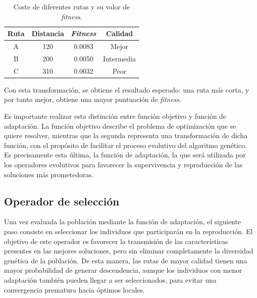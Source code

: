 \begin{table}[ht]
    \renewcommand{\arraystretch}{1.3}
    \caption{Coste de diferentes rutas y su valor de \textit{fitness}.}
    \label{tab:fit_ex}
    \begin{center}
        \begin{tabular}{|c|c|c|c|}
            \hline
            \textbf{Ruta} & \textbf{Distancia} & \textbf{\textit{Fitness}} & \textbf{Calidad} \\
            \hline
            A & 120 & 0.0083 & Mejor \\
            \hline
            B & 200 & 0.0050 & Intermedia \\
            \hline
            C & 310 & 0.0032 & Peor \\
            \hline
        \end{tabular}
    \end{center}
\end{table}

Con esta transformación, se obtiene el resultado esperado: una ruta más corta, y por tanto mejor, obtiene una mayor puntuación
de \textit{fitness}.

Es importante realizar esta distinción entre función objetivo y función de adaptación. La función objetivo describe el problema de 
optimización que se quiere resolver, mientras que la segunda representa una transformación de dicha función, con el propósito
de facilitar el proceso evolutivo del algoritmo genético. Es precisamente esta última, la función de adaptación, la que será 
utilizada por los operadores evolutivos para favorecer la supervivencia y reproducción de las soluciones más prometedoras.

\subsection{Operador de selección}
\label{subsec:selec}

Una vez evaluada la población mediante la función de adaptación, el siguiente paso consiste en seleccionar los individuos que
participarán en la reproducción. El objetivo de este operador es favorecer la transmisión de las características presentes en 
las mejores soluciones, pero sin eliminar completamente la diversidad genética de la población. De esta manera, las rutas de 
mayor calidad tienen una mayor probabilidad de generar descendencia, aunque los individuos con menor adaptación también pueden
llegar a ser seleccionados, para evitar una convergencia prematura hacia óptimos locales.

